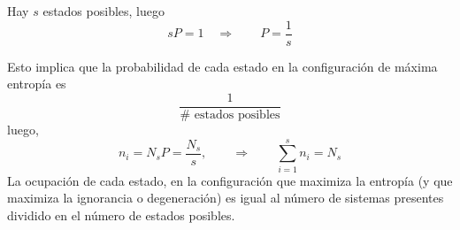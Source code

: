 Hay $s$ estados posibles, luego
\begin{equation}
  sP=1\quad \Rightarrow \qquad P=\frac{1}{s}
\end{equation}

Esto implica que la probabilidad de cada estado en la configuración de máxima entropía es
\begin{equation}
  \frac{1}{\# \text{ estados posibles}}
\end{equation}
luego,
\begin{equation}
  \boxed{n_i=N_sP=\frac{N_s}{s}},\qquad \Rightarrow \qquad \sum_{i=1}^sn_i=N_s
\end{equation}
La ocupación de cada estado, en la configuración que maximiza la entropía (y que maximiza la ignorancia o degeneración) es igual al número de sistemas presentes dividido en el número de estados posibles. 












































